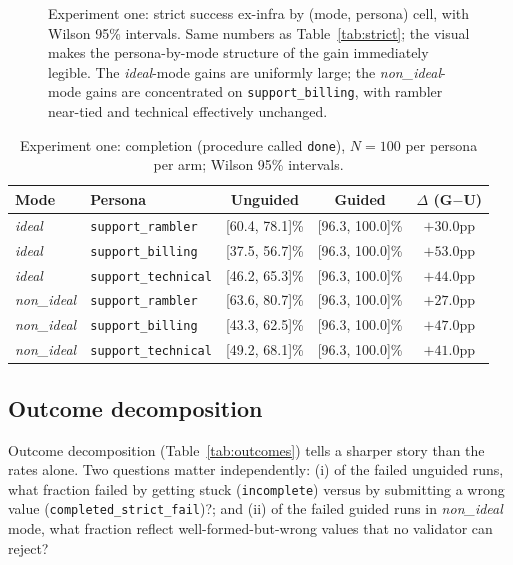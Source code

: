 \documentclass[11pt,a4paper]{article}
\newcommand{\rerunPlaceholderN}{100}
\begin{document}
\begin{figure}[htbp]
  \centering
  
  \caption{Experiment one: strict success ex-infra by (mode, persona) cell,
  with Wilson 95\% intervals. Same numbers as Table~\ref{tab:strict}; the
  visual makes the persona-by-mode structure of the gain immediately
  legible. The \emph{ideal}-mode gains are uniformly large; the
  \emph{non\_ideal}-mode gains are concentrated on \texttt{support\_billing},
  with rambler near-tied and technical effectively unchanged.}
  \label{fig:chart-exp1-strict}
\end{figure}

\begin{table}[htbp]
  \centering
  \caption{Experiment one: completion (procedure called \texttt{done}), $N=\rerunPlaceholderN$ per persona per arm; Wilson 95\% intervals.}
  \label{tab:completion}
  \begin{tabular}{llccc}
    \toprule
    Mode & Persona & Unguided & Guided & $\Delta$ (G$-$U) \\
    \midrule
    \emph{ideal}     & \texttt{support\_rambler}   & [60.4, 78.1]\% & [96.3, 100.0]\% & $+30.0$pp \\
    \emph{ideal}     & \texttt{support\_billing}   & [37.5, 56.7]\% & [96.3, 100.0]\% & $+53.0$pp \\
    \emph{ideal}     & \texttt{support\_technical} & [46.2, 65.3]\% & [96.3, 100.0]\% & $+44.0$pp \\
    \midrule
    \emph{non\_ideal}& \texttt{support\_rambler}   & [63.6, 80.7]\% & [96.3, 100.0]\% & $+27.0$pp \\
    \emph{non\_ideal}& \texttt{support\_billing}   & [43.3, 62.5]\% & [96.3, 100.0]\% & $+47.0$pp \\
    \emph{non\_ideal}& \texttt{support\_technical} & [49.2, 68.1]\% & [96.3, 100.0]\% & $+41.0$pp \\
    \bottomrule
  \end{tabular}
\end{table}

\subsection{Outcome decomposition}

Outcome decomposition (Table~\ref{tab:outcomes}) tells a sharper story than the rates alone. Two questions matter independently: (i) of the failed unguided runs, what fraction failed by getting stuck (\texttt{incomplete}) versus by submitting a wrong value (\texttt{completed\_strict\_fail})?; and (ii) of the failed guided runs in \emph{non\_ideal} mode, what fraction reflect well-formed-but-wrong values that no validator can reject?
\end{document}
